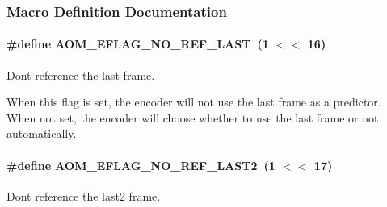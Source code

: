 \subsubsection{Macro Definition Documentation}
\paragraph[{\texorpdfstring{A\+O\+M\+\_\+\+E\+F\+L\+A\+G\+\_\+\+N\+O\+\_\+\+R\+E\+F\+\_\+\+L\+A\+ST}{AOM_EFLAG_NO_REF_LAST}}]{\setlength{\rightskip}{0pt plus 5cm}\#define A\+O\+M\+\_\+\+E\+F\+L\+A\+G\+\_\+\+N\+O\+\_\+\+R\+E\+F\+\_\+\+L\+A\+ST~(1 $<$$<$ 16)}\hypertarget{group__aom__encoder_gae272ed6e69ae2a12993565e8176d004b}{}\label{group__aom__encoder_gae272ed6e69ae2a12993565e8176d004b}


Don\textquotesingle{}t reference the last frame. 

When this flag is set, the encoder will not use the last frame as a predictor. When not set, the encoder will choose whether to use the last frame or not automatically. 
\paragraph[{\texorpdfstring{A\+O\+M\+\_\+\+E\+F\+L\+A\+G\+\_\+\+N\+O\+\_\+\+R\+E\+F\+\_\+\+L\+A\+S\+T2}{AOM_EFLAG_NO_REF_LAST2}}]{\setlength{\rightskip}{0pt plus 5cm}\#define A\+O\+M\+\_\+\+E\+F\+L\+A\+G\+\_\+\+N\+O\+\_\+\+R\+E\+F\+\_\+\+L\+A\+S\+T2~(1 $<$$<$ 17)}\hypertarget{group__aom__encoder_ga50c2560ca6670298cfc614ecae96a391}{}\label{group__aom__encoder_ga50c2560ca6670298cfc614ecae96a391}


Don\textquotesingle{}t reference the last2 frame. 


